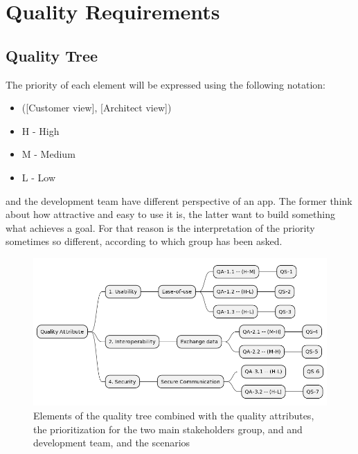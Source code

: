 \section{Quality Requirements}

\subsection{Quality Tree}

The priority of each element will be expressed using the following notation:

\begin{itemize}
    \item ([Customer view], [Architect view])
    \item H - High
    \item M - Medium
    \item L - Low
\end{itemize}

 and the development team have different perspective of an app. The former think about how attractive and easy to use
it is, the latter want to build something what achieves a goal. For that reason is the interpretation of the priority sometimes
so different, according to which group has been asked.

\begin{figure}[H]
    \centering
    \includegraphics[width=1\textwidth]{assets/quality_tree.png}
    \caption{Elements of the quality tree combined with the quality attributes, the prioritization for the two main
    stakeholders group,  and  and development team, and the scenarios}
    \label{fig:quality_tree}
\end{figure}

